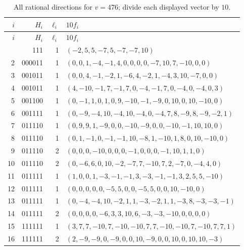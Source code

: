 \documentclass[11pt]{article}
\theoremstyle{remark}
\numberwithin{equation}{section}
\begin{document}
\begingroup\small\begin{longtable}{rrrl}
\caption{All rational directions for $v=476$; divide each displayed vector by $10$.}\label{tab:direct-directions-476}\\
\toprule $i$&$H_i$&$\ell_i$&$10f_i$\\\midrule\endfirsthead
\toprule $i$&$H_i$&$\ell_i$&$10f_i$\\\midrule\endhead
\bottomrule\endfoot
1&111&1&\scriptsize $(-2,5,5,-7,5,-7,-7,10)$\\
2&000011&1&\scriptsize $(0,0,1,-4,-1,4,0,0,0,0,-7,10,7,-10,0,0)$\\
3&001011&1&\scriptsize $(0,0,4,-1,-2,1,-6,4,-2,1,-4,3,10,-7,0,0)$\\
4&001011&1&\scriptsize $(4,-10,-1,7,-1,7,0,-4,-1,7,0,-4,0,-4,0,3)$\\
5&001100&1&\scriptsize $(0,-1,1,0,1,0,9,-10,-1,-9,0,10,0,10,-10,0)$\\
6&001111&1&\scriptsize $(0,-9,-4,10,-4,10,-4,0,-4,7,8,-9,8,-9,-2,1)$\\
7&011110&1&\scriptsize $(0,9,9,1,-9,0,0,-10,-9,0,0,-10,-1,10,10,0)$\\
8&011110&1&\scriptsize $(0,1,-1,0,-1,-1,10,-8,1,-10,1,8,0,10,-10,0)$\\
9&011110&2&\scriptsize $(0,0,0,-10,0,0,0,-1,0,0,0,-1,10,1,1,0)$\\
10&011110&2&\scriptsize $(0,-6,6,0,10,-2,-7,7,-10,7,2,-7,0,-4,4,0)$\\
11&011111&1&\scriptsize $(1,0,0,1,-3,-1,-1,3,-3,-1,-1,3,2,5,5,-10)$\\
12&011111&1&\scriptsize $(0,0,0,0,0,-5,5,0,0,-5,5,0,0,10,-10,0)$\\
13&011111&1&\scriptsize $(0,-4,-4,10,-2,1,1,-3,-2,1,1,-3,8,-3,-3,-1)$\\
14&011111&2&\scriptsize $(0,0,0,0,-6,3,3,10,6,-3,-3,-10,0,0,0,0)$\\
15&111111&1&\scriptsize $(3,7,7,-10,7,-10,-10,7,7,-10,-10,7,-10,7,7,1)$\\
16&111111&2&\scriptsize $(2,-9,-9,0,-9,0,0,10,-9,0,0,10,0,10,10,-3)$\\
\end{longtable}\endgroup
\end{document}
